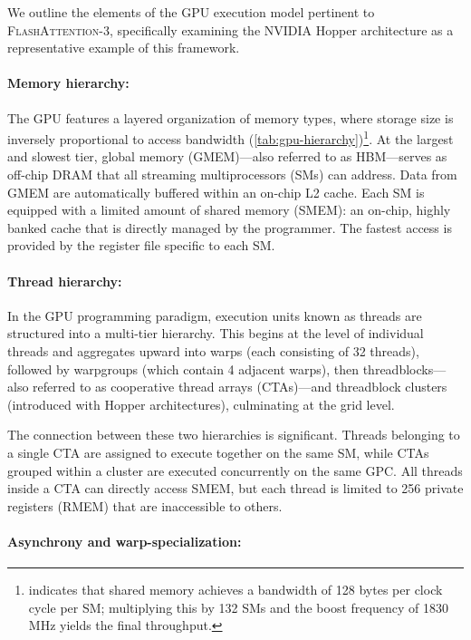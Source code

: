 \begin{enumerate}
We outline the elements of the GPU execution model pertinent to \textsc{FlashAttention-3}, specifically examining the NVIDIA Hopper architecture as a representative example of this framework.

\paragraph{Memory hierarchy:} The GPU features a layered organization of memory types, where storage size is inversely proportional to access bandwidth (\cref{tab:gpu-hierarchy})\footnote{\citet{luo2024benchmarking} indicates that shared memory achieves a bandwidth of 128 bytes per clock cycle per SM; multiplying this by 132 SMs and the boost frequency of 1830 MHz yields the final throughput.}. At the largest and slowest tier, global memory (GMEM)—also referred to as HBM—serves as off-chip DRAM that all streaming multiprocessors (SMs) can address. Data from GMEM are automatically buffered within an on-chip L2 cache. Each SM is equipped with a limited amount of shared memory (SMEM): an on-chip, highly banked cache that is directly managed by the programmer. The fastest access is provided by the register file specific to each SM.

\paragraph{Thread hierarchy:} In the GPU programming paradigm, execution units known as threads are structured into a multi-tier hierarchy. This begins at the level of individual threads and aggregates upward into warps (each consisting of 32 threads), followed by warpgroups (which contain 4 adjacent warps), then threadblocks—also referred to as cooperative thread arrays (CTAs)—and threadblock clusters (introduced with Hopper architectures), culminating at the grid level.

The connection between these two hierarchies is significant. Threads belonging to a single CTA are assigned to execute together on the same SM, while CTAs grouped within a cluster are executed concurrently on the same GPC. All threads inside a CTA can directly access SMEM, but each thread is limited to 256 private registers (RMEM) that are inaccessible to others.

\paragraph{Asynchrony and warp-specialization:}


\end{enumerate}
